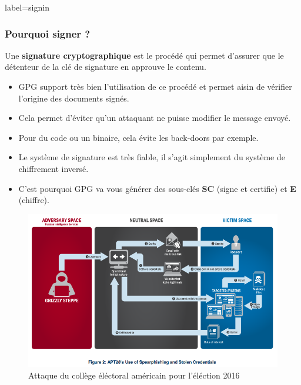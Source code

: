 \documentclass{beamer}
\begin{document}
        \begin{frame}{label=signin}
            \frametitle{Pourquoi signer ?}
            Une \textbf{signature cryptographique} est le procédé qui permet d'assurer que le détenteur de la clé de signature en approuve le contenu.
            \begin{center}
                \begin{itemize}
                    \item GPG support très bien l'utilisation de ce procédé et permet aisin de vérifier l'origine des documents signés.
                    \item Cela permet d'éviter qu'un attaquant ne puisse modifier le message envoyé.
                    \item Pour du code ou un binaire, cela évite les back-doors par exemple.
                    \item Le système de signature est très fiable, il s'agit simplement du système de chiffrement inversé.
                    \item C'est pourquoi GPG va vous générer des sous-clés \textbf{SC} (signe et certifie) et \textbf{E} (chiffre).
                \end{itemize}
            \end{center}
        \end{frame}
        \begin{frame}
            \begin{center}
                \begin{figure}
                    \includegraphics[scale=0.35]{img/signature.png}
                    \caption{Attaque du collège éléctoral américain pour l'éléction 2016}
                \end{figure}
            \end{center}
        \end{frame}
\end{document}
